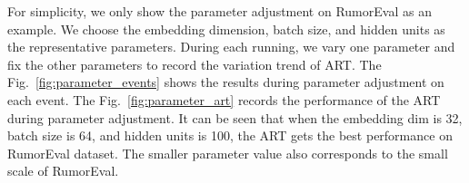 For simplicity, we only show the parameter adjustment on RumorEval as an example. We choose the embedding dimension, batch size, and hidden units as the representative parameters. During each running, we vary one parameter and fix the other parameters to record the variation trend of ART. The Fig.~\ref{fig:parameter_events} shows the results during parameter adjustment on each event. The Fig.~\ref{fig:parameter_art} records the performance of the ART during parameter adjustment. It can be seen that when the embedding dim is 32, batch size is 64, and hidden units is 100, the ART gets the best performance on RumorEval dataset. The smaller parameter value also corresponds to the small scale of RumorEval.

\begin{figure}[htbp]
	\centering
	\setcounter{subfigure}{0}
\end{figure}
